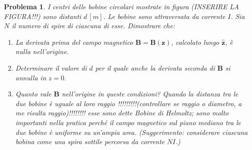 \documentclass[b5paper,twoside]{book}
\newtheorem{problema}{Problema}
\renewcommand{\vec}[1]{\mathbf{#1}}
\renewcommand{\hat}[1]{\widehat{\mathbf{#1}}}
\begin{document}
\begin{problema}%
	I centri delle bobine circolari mostrate in figura (INSERIRE LA FIGURA!!!)
	sono distanti $d\,[m]$. 
	Le bobine sono attraversata da corrente $I$. Sia $N$ il numero di spire di ciascuna di esse. 
	Dimostrare che:
	\begin{enumerate}
		\item La derivata prima del campo magnetico $\vec{B} = \vec{B(z)}$, 
		calcolato lungo $\hat{z}$, è nulla nell'origine.
		\item Determinare il valore di $d$ per il quale anche la 
		derivata seconda di $\vec{B}$ si annulla in $z = 0$.
		\item Quanto vale $\vec{B}$ nell'origine in queste condizioni?
		Quando la distanza tra le due bobine è uguale al loro raggio 
		!!!!!!!!!(controllare se raggio o diametro, a me risulta raggio)!!!!!!!! 
		esse sono dette Bobine di Helmoltz; sono molto importanti 
		nella pratica perché 
		il campo magnetico sul piano
		mediano tra le due bobine è uniforme su un'ampia area.
		(Suggerimento: considerare ciascuna bobina come 
		una spira sottile percorsa da corrente $NI$.)
	\end{enumerate}
\end{problema}
\end{document}
